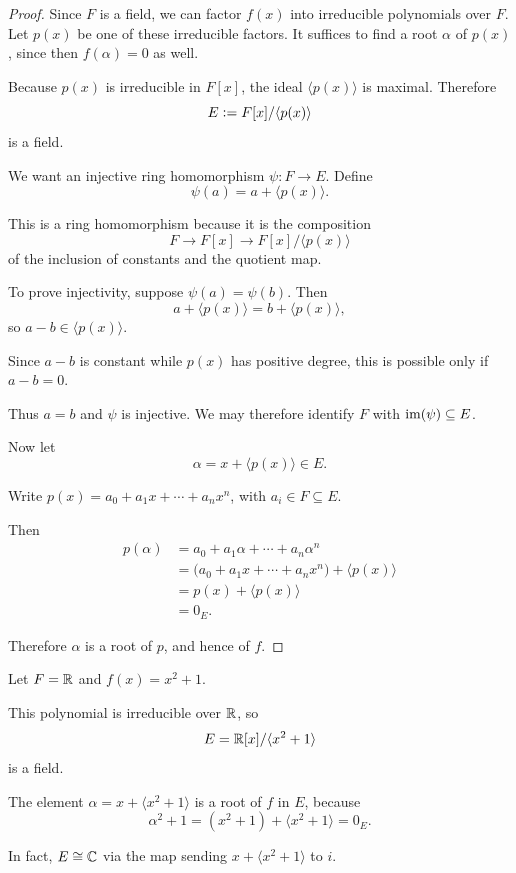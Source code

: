\documentclass[main.tex]{subfiles}
\begin{document}
\begin{proof}
Since $F$ is a field, we can factor $f(x)$ into irreducible
polynomials over $F$. Let $p(x)$ be one of these irreducible factors.
It suffices to find a root $\alpha$ of $p(x)$, since then
$f(\alpha)=0$ as well.

Because $p(x)$ is irreducible in $F[x]$, the ideal $\langle p(x)\rangle$
is maximal. Therefore
\[
E\vcentcolon= F[x]/\langle p(x)\rangle
\]
is a field.

We want an injective ring homomorphism $\psi:F\to E$. Define
\[
\psi(a)=a+\langle p(x)\rangle.
\]

This is a ring homomorphism because it is the composition
\[
F\longrightarrow F[x]\longrightarrow F[x]/\langle p(x)\rangle
\]
of the inclusion of constants and the quotient map.

To prove injectivity, suppose $\psi(a)=\psi(b)$. Then
\[
a+\langle p(x)\rangle=b+\langle p(x)\rangle,
\]
so $a-b\in\langle p(x)\rangle$.

Since $a-b$ is constant while $p(x)$ has positive degree, this
is possible only if $a-b=0$.

Thus $a=b$ and $\psi$ is injective. We may therefore identify
$F$ with $\operatorname{im}(\psi)\subseteq E$.

Now let
\[
\alpha=x+\langle p(x)\rangle\in E.
\]

Write $p(x)=a_0+a_1x+\cdots+a_nx^n$, with $a_i\in F\subseteq E$.

Then
\begin{align*}
p(\alpha)
 &=a_0+a_1\alpha+\cdots+a_n\alpha^n\\
 &=\bigl(a_0+a_1x+\cdots+a_nx^n\bigr)+\langle p(x)\rangle\\
 &=p(x)+\langle p(x)\rangle\\
 &=0_E.
\end{align*}

Therefore $\alpha$ is a root of $p$, and hence of $f$.
\end{proof}



\begin{example}
Let $F=\mathbb{R}$ and $f(x)=x^2+1$.

This polynomial is irreducible over $\mathbb{R}$, so
\[
E=\mathbb{R}[x]/\langle x^2+1\rangle
\]
is a field.

The element $\alpha=x+\langle x^2+1\rangle$ is a root of $f$
in $E$, because
\[
\alpha^2+1=(x^2+1)+\langle x^2+1\rangle=0_E.
\]

In fact, $E\cong\mathbb{C}$ via the map sending
$x+\langle x^2+1\rangle$ to $i$.
\end{example}
\end{document}
